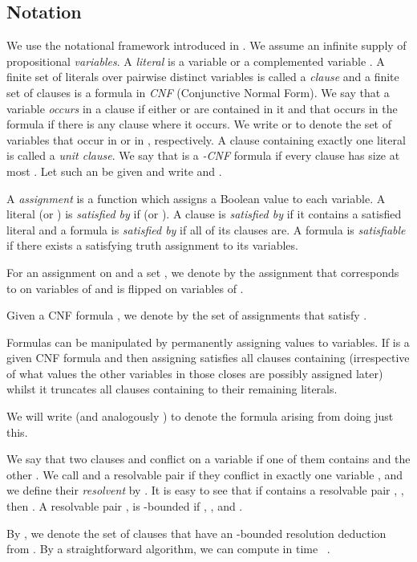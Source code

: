 \subsection{Notation}
We use the notational framework introduced in \cite{welzl05}. We
assume an infinite supply of propositional \emph{variables}. A
\emph{literal}  is a variable  or a complemented variable . A finite set  of literals over pairwise distinct variables is
called a \emph{clause} and a finite set of clauses is a formula
in \emph{CNF} (Conjunctive Normal Form). We say that a variable 
\emph{occurs} in a clause  if either  or  are contained
in it and that  occurs in the formula  if there is any clause
where it occurs. 
We write  or  to denote
the set of variables that occur in  or in , respectively. 
A clause containing exactly one literal is called a \emph{unit clause}. We
say that  is a 
\emph{-CNF} formula
if every clause has
size at most .  Let such an  be given and write
 and .

A \emph{assignment} is a function  which assigns a Boolean value to each variable. A literal
 (or ) is \emph{satisfied by}  if 
(or ). A clause is \emph{satisfied by}  if it
contains a satisfied literal and a formula is \emph{satisfied by}
 if all of its clauses are. A formula is \emph{satisfiable} if
there exists a satisfying truth assignment to its variables.

For an assignment  on  and a set , we denote
by  the assignment that corresponds to  on
variables of  and is flipped on variables of .

Given a CNF formula , we denote by  the set of assignments that
satisfy .

Formulas can be manipulated by permanently assigning values to
variables. If  is a given CNF formula and 
then assigning  satisfies all clauses containing 
(irrespective of what values the other variables in those closes are
possibly assigned later) whilst it truncates all clauses containing
 to their remaining literals. 

We will write  (and analogously ) to
denote the formula arising from doing just this.

We say that two clauses  and  conflict on a variable  if
one of them contains  and the other . We call  and
 a resolvable pair if they conflict in exactly one variable ,
and we define their \emph{resolvent} by . It is easy to see that if  contains a
resolvable pair , , then . A
resolvable pair ,  is -bounded if ,
, and .

By , we denote the set of clauses  that have an
-bounded resolution deduction from . By a straightforward
algorithm, we can compute  in time
~\cite{ppsz}.

